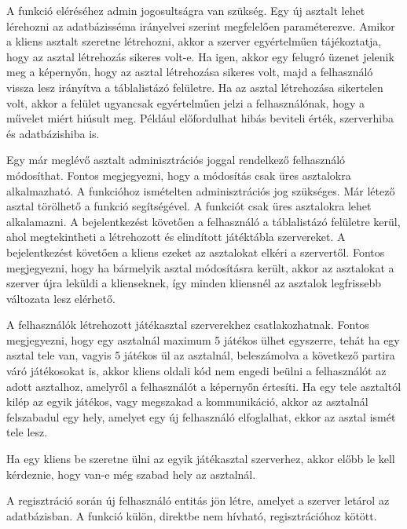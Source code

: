 \clearpage

A funkció eléréséhez admin jogosultságra van szükség. Egy új asztalt lehet lérehozni az adatbázisséma irányelvei szerint megfelelően paraméterezve. Amikor a kliens asztalt szeretne létrehozni, akkor a szerver egyértelműen tájékoztatja, hogy az asztal létrehozás sikeres volt-e. Ha igen, akkor egy felugró üzenet jelenik meg a képernyőn, hogy az asztal létrehozása sikeres volt, majd a felhasználó vissza lesz irányítva a táblalistázó felületre. Ha az asztal létrehozása sikertelen volt, akkor a felület ugyancsak egyértelműen jelzi a felhasználónak, hogy a művelet miért hiúsult meg. Például előfordulhat hibás beviteli érték, szerverhiba és adatbázishiba is.

Egy már meglévő asztalt adminisztrációs joggal rendelkező felhasználó módosíthat. Fontos megjegyezni, hogy a módosítás csak üres asztalokra alkalmazható.
A funkcióhoz ismételten adminisztrációs jog szükséges. Már létező asztal törölhető a funkció segítségével. A funkciót csak üres asztalokra lehet alkalamazni.
A bejelentkezést követően a felhasználó a táblalistázó felületre kerül, ahol megtekintheti a létrehozott és elindított játéktábla szervereket. A bejelentkezést követően a kliens ezeket az asztalokat elkéri a szervertől. Fontos megjegyezni, hogy ha bármelyik asztal módosításra került, akkor az asztalokat a szerver újra leküldi a klienseknek, így minden kliensnél az asztalok legfrissebb változata lesz elérhető.

A felhasználók létrehozott játékasztal szerverekhez csatlakozhatnak. Fontos megjegyezni, hogy egy asztalnál maximum 5 játékos ülhet egyszerre, tehát ha egy asztal tele van, vagyis 5 játékos ül az asztalnál, beleszámolva a következő partira váró játékosokat is, akkor kliens oldali kód nem engedi beülni a felhasználót az adott asztalhoz, amelyről a felhasználót a képernyőn értesíti. Ha egy tele asztaltól kilép az egyik játékos, vagy megszakad a kommunikáció, akkor az asztalnál felszabadul egy hely, amelyet egy új felhasználó elfoglalhat, ekkor az asztal ismét tele lesz.

Ha egy kliens be szeretne ülni az egyik játékasztal szerverhez, akkor előbb le kell kérdeznie, hogy van-e még szabad hely az asztalnál.

A regisztráció során új felhasználó entitás jön létre, amelyet a szerver letárol az adatbázisban. A funkció külön, direktbe nem hívható, regisztrációhoz kötött.

